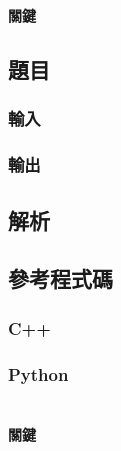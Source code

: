\documentclass[a4paper,10pt]{article}
\begin{document}
\section{}

\paragraph{關鍵}

\subsection{題目}



\subsubsection{輸入}



\subsubsection{輸出}



\subsection{解析}



\subsection{參考程式碼}

\subsubsection{C++}

%

\subsubsection{Python}

%

\section{}

\paragraph{關鍵}
\end{document}
